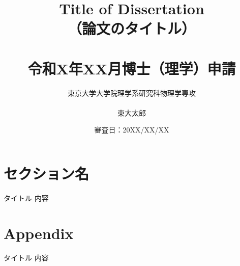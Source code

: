 \documentclass[aspectratio=169, 9pt]{beamer}
\title{Title of Dissertation\\
    （論文のタイトル） \\
    {}~{} \\
    令和X年XX月博士（理学）申請
    }
\author{東京大学大学院理学系研究科物理学専攻 \\
    {}~{} \\
    東大太郎}
\date{審査日：20XX/XX/XX}
\begin{document}
\begin{frame}
    \titlepage
\end{frame}

\section{セクション名}

\begin{frame}{タイトル}
    内容
\end{frame}

\appendix

\section{Appendix}

\begin{frame}{タイトル}
    内容
\end{frame}
\end{document}
